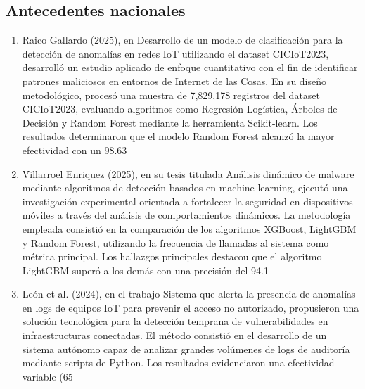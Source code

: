 \subsection{Antecedentes nacionales}
\begin{enumerate}

\item Raico Gallardo (2025), en Desarrollo de un modelo de clasificación para la detección de anomalías en redes IoT utilizando el dataset CICIoT2023, desarrolló un estudio aplicado de enfoque cuantitativo con el fin de identificar patrones maliciosos en entornos de Internet de las Cosas. En su diseño metodológico, procesó una muestra de 7,829,178 registros del dataset CICIoT2023, evaluando algoritmos como Regresión Logística, Árboles de Decisión y Random Forest mediante la herramienta Scikit-learn. Los resultados determinaron que el modelo Random Forest alcanzó la mayor efectividad con un 98.63%

\item Villarroel Enriquez (2025), en su tesis titulada Análisis dinámico de malware mediante algoritmos de detección basados en machine learning, ejecutó una investigación experimental orientada a fortalecer la seguridad en dispositivos móviles a través del análisis de comportamientos dinámicos. La metodología empleada consistió en la comparación de los algoritmos XGBoost, LightGBM y Random Forest, utilizando la frecuencia de llamadas al sistema como métrica principal. Los hallazgos principales destacou que el algoritmo LightGBM superó a los demás con una precisión del 94.1%

\item León et al. (2024), en el trabajo Sistema que alerta la presencia de anomalías en logs de equipos IoT para prevenir el acceso no autorizado, propusieron una solución tecnológica para la detección temprana de vulnerabilidades en infraestructuras conectadas. El método consistió en el desarrollo de un sistema autónomo capaz de analizar grandes volúmenes de logs de auditoría mediante scripts de Python. Los resultados evidenciaron una efectividad variable (65%


\end{enumerate}
